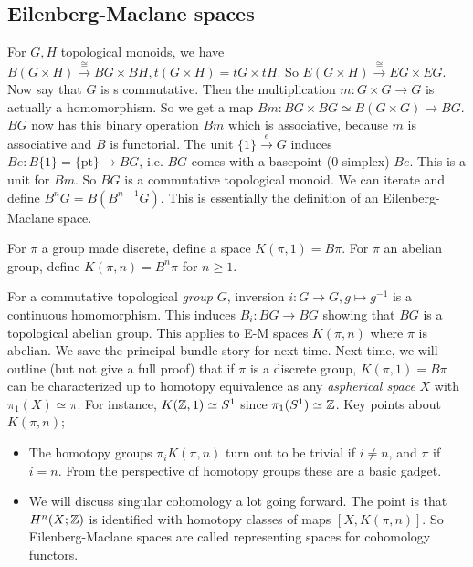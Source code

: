\subsection{Eilenberg-Maclane spaces}
For $G,H$ topological monoids, we have $B(G \times H) \xrightarrow{\cong} BG \times BH, t(G\times H) =tG \times tH$. So $E(G \times H) \xrightarrow{\cong} EG \times EG$. Now say that $G$ is s commutative. Then the multiplication $ m \colon G \times G \to G$ is actually a homomorphism. So we get a map $Bm \colon BG \times BG \simeq  B(G \times G) \to BG$. $BG$ now has this binary operation $Bm$ which is associative, because $m$ is associative and $B$ is functorial. The unit $\{1\} \xrightarrow eG$ induces $Be \colon B \{1\} =\{\mathrm{pt}\}  \to BG$, i.e. $BG$ comes with a basepoint (0-simplex) $Be$. This is a unit for $Bm$. So $BG$ is a commutative topological monoid. We can iterate and define $B^n G=B(B^{n-1}G)$. This is essentially the definition of an Eilenberg-Maclane space.
\begin{definition}[E-M spaces]
    For $\pi$ a group made discrete, define a space $K(\pi,1)=B\pi$. For $\pi$ an abelian group, define $K(\pi,n)=B^n \pi$ for $n \geq 1$.
\end{definition}
For a commutative topological \emph{group} $G$, inversion $i \colon G \to G, g \mapsto  g^{-1}$ is a continuous homomorphism. This induces $B_i  \colon BG \to BG$ showing that $BG$ is a topological abelian group. This applies to E-M spaces $K(\pi,n)$ where $\pi$ is abelian. 
We save the principal bundle story for next time. Next time, we will outline (but not give a full proof) that if $\pi$ is a discrete group, $K(\pi,1)=B \pi$ can be characterized up to homotopy equivalence as any \emph{aspherical space} $X$ with $\pi_1(X) \simeq  \pi$. For instance, $K(\mathbb{Z},1) \simeq S^1 $ since $\pi_1(S^1 )\simeq  \mathbb{Z}$.
Key points about $K(\pi,n)$; 
\begin{itemize}
\setlength\itemsep{-.2em}
    \item The homotopy groups $\pi_i K( \pi,n)$ turn out to be trivial if $i \neq n$, and  $\pi$ if $i=n$. From the perspective of homotopy groups these are a basic gadget.
    \item  We will discuss singular cohomology a lot going forward. The point is that $H^n (X; \mathbb{Z}) $ is identified with homotopy classes of maps $[X,K(\pi,n)]$. So Eilenberg-Maclane spaces are called representing spaces for cohomology functors.
\end{itemize}
